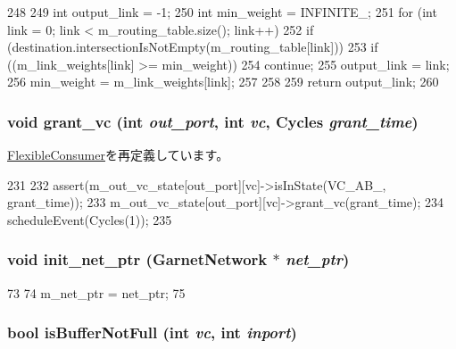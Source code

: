 \begin{DoxyCode}
248 {
249     int output_link = -1;
250     int min_weight = INFINITE_;
251     for (int link = 0; link < m_routing_table.size(); link++) {
252         if (destination.intersectionIsNotEmpty(m_routing_table[link])) {
253             if ((m_link_weights[link] >= min_weight))
254                 continue;
255             output_link = link;
256             min_weight = m_link_weights[link];
257         }
258     }
259     return output_link;
260 }
\end{DoxyCode}
\hypertarget{classRouter_af90fb6c473130244fe64e30e61b714f6}{
\subsubsection[{grant\_\-vc}]{\setlength{\rightskip}{0pt plus 5cm}void grant\_\-vc (int {\em out\_\-port}, \/  int {\em vc}, \/  {\bf Cycles} {\em grant\_\-time})}}
\label{classRouter_af90fb6c473130244fe64e30e61b714f6}


\hyperlink{classFlexibleConsumer_a775e8414113748731990f3979cdd4632}{FlexibleConsumer}を再定義しています。


\begin{DoxyCode}
231 {
232     assert(m_out_vc_state[out_port][vc]->isInState(VC_AB_, grant_time));
233     m_out_vc_state[out_port][vc]->grant_vc(grant_time);
234     scheduleEvent(Cycles(1));
235 }
\end{DoxyCode}
\hypertarget{classRouter_ab5da6a3c41f86ad2993eb11f4894ef00}{
\subsubsection[{init\_\-net\_\-ptr}]{\setlength{\rightskip}{0pt plus 5cm}void init\_\-net\_\-ptr ({\bf GarnetNetwork} $\ast$ {\em net\_\-ptr})}}
\label{classRouter_ab5da6a3c41f86ad2993eb11f4894ef00}



\begin{DoxyCode}
73     { 
74         m_net_ptr = net_ptr; 
75     }
\end{DoxyCode}
\hypertarget{classRouter_af3465adbf20f8764ea878ce2d28d2bc8}{
\subsubsection[{isBufferNotFull}]{\setlength{\rightskip}{0pt plus 5cm}bool isBufferNotFull (int {\em vc}, \/  int {\em inport})}}
\label{classRouter_af3465adbf20f8764ea878ce2d28d2bc8}


